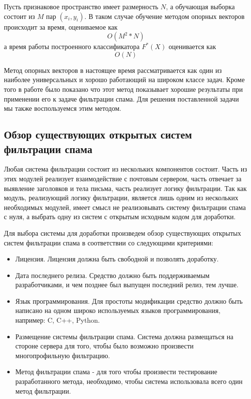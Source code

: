 Пусть признаковое пространство имеет размерность $N$, а обучающая выборка состоит из $M$ пар $(x_i, y_i)$. В таком случае обучение методом опорных векторов происходит за время, оцениваемое как
\begin{equation}
O(M^2*N)
\end{equation}
а время работы построенного классификатора $F^*(X)$ оценивается как 
\begin{equation}
O(N)
\end{equation}

Метод опорных векторов в настоящее время рассматривается как один из наиболее универсальных и хорошо работающий на широком классе задач. Кроме того в работе\cite{ROZ} было показано что этот метод показывает хорошие результаты при применении его к задаче фильтрации спама. Для решения поставленной задачи мы также воспользуемся этим методом.

\subsection{Обзор существующих открытых систем фильтрации спама}
Любая система фильтрации состоит из нескольких компонентов состоит. Часть из этих модулей реализует взаимодействие с почтовым сервером, часть отвечает за выявление заголовков и тела письма, часть реализует логику фильтрации. Так как модуль, реализующий логику фильтрации, является лишь одним из нескольких необходимых модулей, имеет смысл не реализовывать систему фильтрации спама с нуля, а выбрать одну из систем с открытым исходным кодом для доработки.

Для выбора системы для доработки произведем обзор существующих открытых систем фильтрации спама в соответствии со следующими критериями:
\begin{itemize}
\item Лицензия. Лицензия должна быть свободной и позволять доработку.
\item Дата последнего релиза. Средство должно быть поддерживаемым разработчиками, и чем позднее был выпущен последний релиз, тем лучше.
\item Язык программирования. Для простоты модификации средство должно быть написано на одном широко используемых языков программирования, например: C, C++, Python.
\item Размещение системы фильтрации спама. Система должна размещаться на стороне сервера для того, чтобы было возможно произвести многопрофильную фильтрацию. 
\item Метод фильтрации спама - для того чтобы произвести тестирование разработанного метода, необходимо, чтобы система использовала всего один метод фильтрации.
\end{itemize}

